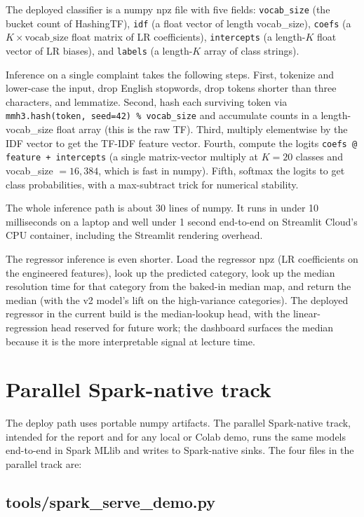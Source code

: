 \documentclass[11pt,letterpaper]{book}
\begin{document}
The deployed classifier is a numpy npz file with five fields: \texttt{vocab\_size} (the bucket count of HashingTF), \texttt{idf} (a float vector of length vocab\_size), \texttt{coefs} (a $K \times \mathrm{vocab\_size}$ float matrix of LR coefficients), \texttt{intercepts} (a length-$K$ float vector of LR biases), and \texttt{labels} (a length-$K$ array of class strings).

Inference on a single complaint takes the following steps. First, tokenize and lower-case the input, drop English stopwords, drop tokens shorter than three characters, and lemmatize. Second, hash each surviving token via \texttt{mmh3.hash(token, seed=42) \% vocab\_size} and accumulate counts in a length-vocab\_size float array (this is the raw TF). Third, multiply elementwise by the IDF vector to get the TF-IDF feature vector. Fourth, compute the logits \texttt{coefs @ feature + intercepts} (a single matrix-vector multiply at $K = 20$ classes and vocab\_size $= 16,384$, which is fast in numpy). Fifth, softmax the logits to get class probabilities, with a max-subtract trick for numerical stability.

The whole inference path is about 30 lines of numpy. It runs in under 10 milliseconds on a laptop and well under 1 second end-to-end on Streamlit Cloud's CPU container, including the Streamlit rendering overhead.

The regressor inference is even shorter. Load the regressor npz (LR coefficients on the engineered features), look up the predicted category, look up the median resolution time for that category from the baked-in median map, and return the median (with the v2 model's lift on the high-variance categories). The deployed regressor in the current build is the median-lookup head, with the linear-regression head reserved for future work; the dashboard surfaces the median because it is the more interpretable signal at lecture time.

\section{Parallel Spark-native track}

The deploy path uses portable numpy artifacts. The parallel Spark-native track, intended for the report and for any local or Colab demo, runs the same models end-to-end in Spark MLlib and writes to Spark-native sinks. The four files in the parallel track are:

\subsection*{tools/spark\_serve\_demo.py}
\end{document}
